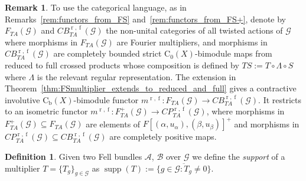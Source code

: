 \documentclass[11 pt, leqno]{amsart}
\numberwithin{equation}{section}
\theoremstyle{plain}
\theoremstyle{definition}
\newtheorem {defn}[thm] {Definition}
\newtheorem {rem} [thm]{Remark}
\newcommand*{\contz}{\mathrm{C_0}}%
\newcommand*{\contb}{\mathrm{C_b}}%
\DeclareMathOperator{\rd}{r}%
\DeclareMathOperator{\f}{f}%
\DeclareMathOperator{\supp}{supp}
\newcommand{\B}{\mathcal B}
\newcommand{\m}{m}
\newcommand{\G}{\mathcal G} %
\newcommand{\A}{\mathcal A}
\begin{document}
\begin{rem}\label{rem:functors_from_F}
To use the categorical language, as in Remarks~\ref{rem:functors_from_FS} and~\ref{rem:functors_from_FS+}, denote by $F_{TA}(\G)$ and $CB_{TA}^{\rd, \f}(\G)$ the non-unital categories of all twisted actions of $\G$ where morphisms in $F_{TA}(\G)$ are Fourier multipliers, and morphisms in $CB_{TA}^{\rd, \f}(\G)$ are completely bounded strict $\contz(X)$-bimodule maps from reduced to full crossed products whose composition is defined by $T S:= T \circ \Lambda \circ S$ where $\Lambda$ is the relevant regular representation.  
The extension in Theorem~\ref{thm:FSmultiplier_extends_to_reduced_and_full} gives a contractive involutive $\contb(X)$-bimodule functor $\m^{\rd,\f}:F_{TA}(\G)\to CB_{TA}^{\rd,\f}(\G)$. 
It restricts to an isometric functor $\m^{\rd,\f}:F_{TA}^+(\G)\to CP_{TA}^{\rd,\f}(\G)$, where morphisms in $F_{TA}^+(\G)\subseteq F_{TA}(\G)$ are elements of $F[(\alpha,u_{\alpha}),(\beta,u_{\beta})]^+$ and morphisms in $CP_{TA}^{\rd,\f}(\G)\subseteq CB_{TA}^{\rd, \f}(\G)$ are completely positive maps.
\end{rem}

\begin{defn}\label{def:support_of_a_multiplier}
Given two Fell bundles $\A$, $\B$ over $\G$ we define the \emph{support} of a multiplier $T=\{T_g\}_{g\in \G}$ as $\supp (T) := \overline{ \{ g\in \G: T_g\neq 0 \} }$.
\end{defn}
 
\end{document}
